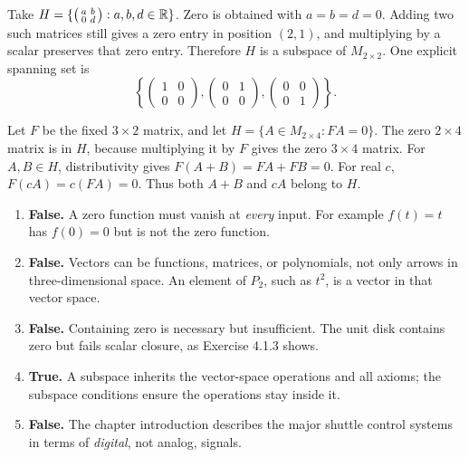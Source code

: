 Take $H=\{\left(\begin{smallmatrix}a&b\\0&d\end{smallmatrix}\right):a,b,d\in\mathbb{R}\}$.
Zero is obtained with $a=b=d=0$. Adding two such matrices still gives a
zero entry in position $(2,1)$, and multiplying by a scalar preserves that
zero entry. Therefore $H$ is a subspace of $M_{2\times2}$.
One explicit spanning set is
\[
 \left\{\begin{pmatrix}1&0\\0&0\end{pmatrix},
 \begin{pmatrix}0&1\\0&0\end{pmatrix},
 \begin{pmatrix}0&0\\0&1\end{pmatrix}\right\}.
\]

Let $F$ be the fixed $3\times2$ matrix, and let
$H=\{A\in M_{2\times4}:FA=0\}$. The zero $2\times4$ matrix is in $H$,
because multiplying it by $F$ gives the zero $3\times4$ matrix.
For $A,B\in H$, distributivity gives $F(A+B)=FA+FB=0$.
For real $c$, $F(cA)=c(FA)=0$. Thus both $A+B$ and $cA$ belong to $H$.

\begin{enumerate}[label=(\alph*)]
\item \textbf{False.} A zero function must vanish at \emph{every} input.
For example $f(t)=t$ has $f(0)=0$ but is not the zero function.
\item \textbf{False.} Vectors can be functions, matrices, or polynomials,
not only arrows in three-dimensional space. An element of $P_2$, such as
$t^2$, is a vector in that vector space.
\item \textbf{False.} Containing zero is necessary but insufficient. The
unit disk contains zero but fails scalar closure, as Exercise 4.1.3 shows.
\item \textbf{True.} A subspace inherits the vector-space operations and
all axioms; the subspace conditions ensure the operations stay inside it.
\item \textbf{False.} The chapter introduction describes the major shuttle
control systems in terms of \emph{digital}, not analog, signals.
\end{enumerate}

